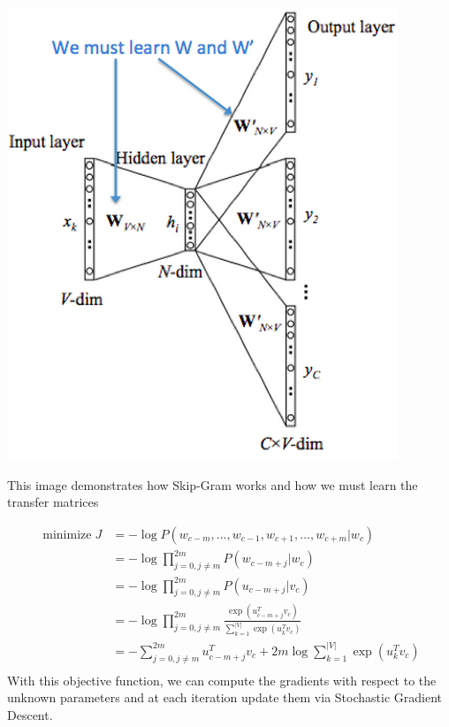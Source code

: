 \documentclass{tufte-handout}
\begin{document}
\begin{marginfigure}%
  \includegraphics[width=\linewidth]{Skip-Gram}
  \caption{This image demonstrates how Skip-Gram works and how we must learn the transfer matrices}
  \label{fig:Skipgram}
\end{marginfigure}

\begin{align*}
\operatorname{minimize} J &= -\log P(w_{c-m}, \hdots, w_{c-1}, w_{c+1}, \hdots, w_{c+m}|w_{c})\\
&= -\log \prod_{j=0, j\neq m}^{2m} P(w_{c-m+j}|w_{c})\\
&= -\log \prod_{j=0, j\neq m}^{2m} P(u_{c-m+j}|v_{c})\\
&= -\log \prod_{j=0, j\neq m}^{2m} \frac{\exp(u_{c-m+j}^{T}v_{c})}{\sum_{k=1}^{|V|}\exp(u_{k}^{T}v_{c})}\\
&= -\sum_{j=0, j\neq m}^{2m} u_{c-m+j}^{T}v_{c} + 2m\log \sum_{k=1}^{|V|}\exp(u_{k}^{T}v_{c})\\
\end{align*}
With this objective function, we can compute the gradients with respect to the unknown
parameters and at each iteration update them via Stochastic Gradient Descent.
\end{document}
